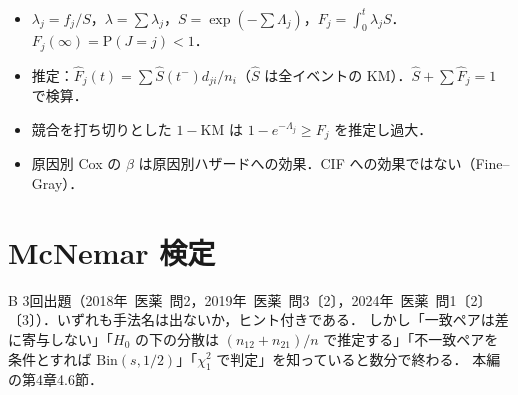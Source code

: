 \documentclass[a4paper,11pt,openany]{ltjsbook}
\newcommand{\kakomon}[2]{\mbox{#1年 医薬 問#2}}
\newcommand{\Prob}{\mathrm{P}}
\newcommand{\Bin}{\mathrm{Bin}}
\begin{document}
\begin{summarybox}
\begin{itemize}
\item $\lambda_j=f_j/S$，$\lambda=\sum\lambda_j$，$S=\exp(-\sum\Lambda_j)$，$F_j=\int_0^t\lambda_jS$．$F_j(\infty)=\Prob(J=j)<1$．
\item 推定：$\hat F_j(t)=\sum\hat S(t^-)d_{ji}/n_i$（$\hat S$ は全イベントの KM）．$\hat S+\sum\hat F_j=1$ で検算．
\item 競合を打ち切りとした $1-\mathrm{KM}$ は $1-e^{-\Lambda_j}\ge F_j$ を推定し過大．
\item 原因別 Cox の $\beta$ は原因別ハザードへの効果．CIF への効果ではない（Fine--Gray）．
\end{itemize}
\end{summarybox}

\chapter{McNemar 検定}\label{ch:m06}

\begin{priobox}{B}
3回出題（\kakomon{2018}{2}，\kakomon{2019}{3}〔2〕，\kakomon{2024}{1}〔2〕〔3〕）．いずれも手法名は出ないか，ヒント付きである．
しかし「一致ペアは差に寄与しない」「$H_0$ の下の分散は $(n_{12}+n_{21})/n$ で推定する」「不一致ペアを条件とすれば $\Bin(s,1/2)$」「$\chi^2_1$ で判定」を知っていると数分で終わる．
本編の第4章4.6節．
\end{priobox}

\end{document}
